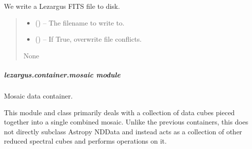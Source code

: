 \documentclass[letterpaper,11pt,english]{sphinxmanual}
\begin{document}
\begin{savenotes}
\begin{fulllineitems}
\begin{savenotes}
\begin{fulllineitems}
\sphinxAtStartPar
We write a Lezargus FITS file to disk.
\begin{quote}\begin{description}
\begin{itemize}
\item {} 
\sphinxAtStartPar
{} () – The filename to write to.

\item {} 
\sphinxAtStartPar
{} (\sphinxstyleliteralemphasis{\sphinxupquote{, }}) – If True, overwrite file conflicts.

\end{itemize}

\sphinxAtStartPar
None

\end{description}\end{quote}

\end{fulllineitems}\end{savenotes}


\end{fulllineitems}\end{savenotes}


\sphinxstepscope


\subparagraph{lezargus.container.mosaic module}
\label{\detokenize{code/lezargus.container.mosaic:module-lezargus.container.mosaic}}\label{\detokenize{code/lezargus.container.mosaic:lezargus-container-mosaic-module}}\label{\detokenize{code/lezargus.container.mosaic::doc}}
\sphinxAtStartPar
Mosaic data container.

\sphinxAtStartPar
This module and class primarily deals with a collection of data cubes pieced
together into a single combined mosaic. Unlike the previous containers, this
does not directly subclass Astropy NDData and instead acts as a collection of
other reduced spectral cubes and performs operations on it.
\end{document}
